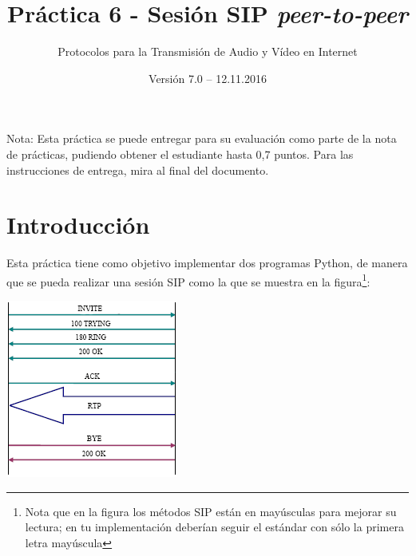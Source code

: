 \documentclass[a4paper,11pt]{article}
\begin{document}
\title{Práctica 6 - Sesión SIP \emph{peer-to-peer}}
\author{Protocolos para la Transmisión de Audio y Vídeo en Internet}
\date{Versión 7.0 – 12.11.2016}



\maketitle
\thispagestyle{empty}



Nota: Esta práctica se puede entregar para su evaluación como parte de la nota de prácticas, pudiendo obtener el estudiante hasta 0,7 puntos. Para las instrucciones de entrega, mira al final del documento.

\section*{Introducción}

Esta práctica tiene como objetivo implementar dos programas Python,
de manera que se pueda realizar una sesión SIP como la que se
muestra en la figura\footnote{Nota que en la figura los métodos SIP están en 
mayúsculas para mejorar su lectura; en tu implementación deberían seguir el 
estándar con sólo la primera letra mayúscula}:

\begin{center}
\includegraphics{figs/sip-invite.png}
\end{center}
\end{document}
